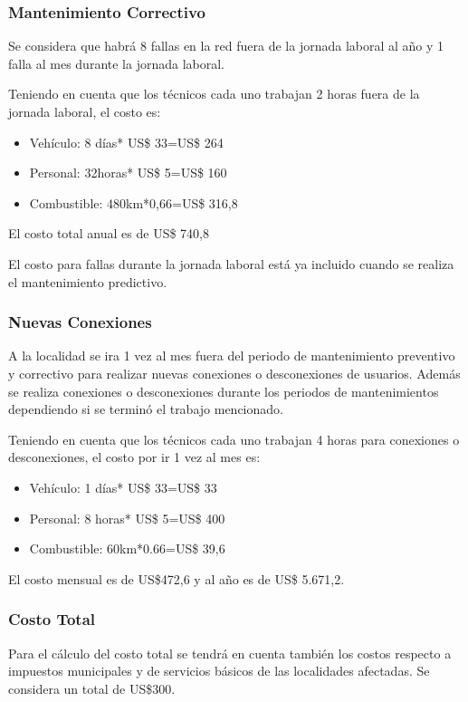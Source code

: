 \subsubsection{Mantenimiento Correctivo}

Se considera que habrá 8 fallas en la red  fuera de la jornada laboral al año y 1 falla al mes durante la jornada laboral. 

Teniendo en cuenta que los técnicos cada uno trabajan 2 horas fuera de la jornada laboral, el costo es:
\begin{itemize}
\item Vehículo: 8 días* US\$ 33=US\$ 264
\item Personal: 32horas* US\$ 5=US\$ 160 
\item Combustible: 480km*0,66=US\$ 316,8
\end{itemize}

El costo total anual es de US\$ 740,8

El costo para fallas durante la jornada laboral está ya incluido cuando se realiza el mantenimiento predictivo.

\subsubsection{Nuevas Conexiones}
%
A la localidad se ira 1 vez al mes fuera del periodo de mantenimiento preventivo y correctivo para realizar nuevas conexiones o desconexiones de usuarios. Además se realiza conexiones o desconexiones durante los periodos de mantenimientos dependiendo si se terminó el trabajo mencionado.

Teniendo en cuenta que los técnicos cada uno trabajan 4 horas para conexiones o desconexiones, el costo por ir 1 vez al mes es:
%
\begin{itemize}
\item Vehículo: 1 días* US\$ 33=US\$ 33
\item Personal: 8 horas* US\$ 5=US\$ 400
\item Combustible: 60km*0.66=US\$ 39,6
\end{itemize}
%
El costo mensual es de US\$472,6 y al año es de US\$ 5.671,2.
%
\subsubsection{Costo Total}

Para el cálculo del costo total se tendrá en cuenta también los costos respecto a impuestos municipales y de servicios básicos de las localidades afectadas. Se considera un total de US\$300. 

